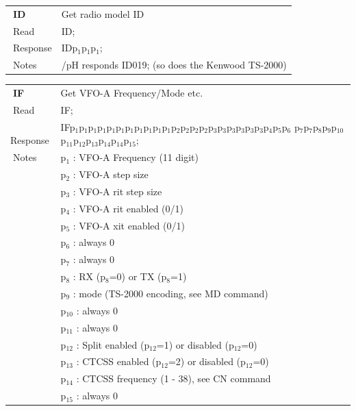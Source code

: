 \documentclass[12pt]{book}
\begin{document}
\begin{center}
\begin{tabular}{|p{2cm}|p{11cm}|}
\toprule
$\phantom{\Big|}$\textbf{\large ID} & Get radio model ID \\\cline{1-2}
$\phantom{\Big|}${\large Read} & {ID;} \\\hline
$\phantom{\Big|}${\large Response} & {IDp$_1$p$_1$p$_1$;} \\\hline
$\phantom{\Big|}${\large Notes} & \multicolumn{1}{|p{11cm}|}{/pH responds ID019; (so does the Kenwood TS-2000)} \\
\bottomrule
\end{tabular}
\end{center}

\begin{center}
\begin{tabular}{|p{2cm}|p{11cm}|}
\toprule
$\phantom{\Big|}$\textbf{\large IF} & Get VFO-A Frequency/Mode etc. \\\cline{1-2}
$\phantom{\Big|}${\large Read} & {IF;} \\\hline
$\phantom{\Big|}${\large Response} & {IFp$_1$p$_1$p$_1$p$_1$p$_1$p$_1$p$_1$p$_1$p$_1$p$_1$p$_1$p$_2$p$_2$p$_2$p$_2$p$_3$p$_3$p$_3$p$_3$p$_3$p$_3$p$_4$p$_5$p$_6$
p$_7$p$_7$p$_8$p$_9$p$_{10}$p$_{11}$p$_{12}$p$_{13}$p$_{14}$p$_{14}$p$_{15}$;} \\\hline
$\phantom{\Big|}${\large Notes} & \multicolumn{1}{|p{11cm}|}{p$_1$ : VFO-A Frequency (11 digit)} \\
 & \multicolumn{1}{|p{11cm}|}{p$_2$ : VFO-A step size} \\
 & \multicolumn{1}{|p{11cm}|}{p$_3$ : VFO-A rit step size} \\
 & \multicolumn{1}{|p{11cm}|}{p$_4$ : VFO-A rit enabled (0/1)} \\
 & \multicolumn{1}{|p{11cm}|}{p$_5$ : VFO-A xit enabled (0/1)} \\
 & \multicolumn{1}{|p{11cm}|}{p$_6$ : always 0} \\
 & \multicolumn{1}{|p{11cm}|}{p$_7$ : always 0} \\
 & \multicolumn{1}{|p{11cm}|}{p$_8$ : RX (p$_8$=0) or TX (p$_8$=1)} \\
 & \multicolumn{1}{|p{11cm}|}{p$_9$ : mode (TS-2000 encoding, see MD command)} \\
 & \multicolumn{1}{|p{11cm}|}{p$_{10}$ : always 0} \\
 & \multicolumn{1}{|p{11cm}|}{p$_{11}$ : always 0} \\
 & \multicolumn{1}{|p{11cm}|}{p$_{12}$ : Split enabled (p$_{12}$=1) or disabled (p$_{12}$=0)} \\
 & \multicolumn{1}{|p{11cm}|}{p$_{13}$ : CTCSS enabled (p$_{12}$=2) or disabled (p$_{12}$=0)} \\
 & \multicolumn{1}{|p{11cm}|}{p$_{14}$ : CTCSS frequency (1 - 38), see CN command} \\
 & \multicolumn{1}{|p{11cm}|}{p$_{15}$ : always 0} \\
\bottomrule
\end{tabular}
\end{center}
\end{document}
